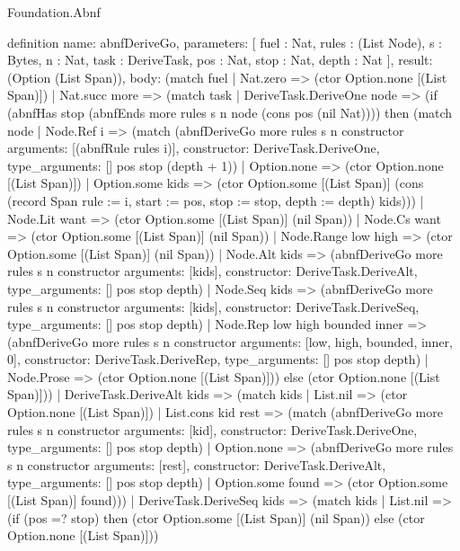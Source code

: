 \begin{lexlean}{Foundation.Abnf}
\begin{semanticmodule}
definition{
  name: abnfDeriveGo,
  parameters: [
    fuel : Nat,
    rules : (List Node),
    s : Bytes,
    n : Nat,
    task : DeriveTask,
    pos : Nat,
    stop : Nat,
    depth : Nat
  ],
  result: (Option (List Span)),
  body: (match fuel
    | Nat.zero => (ctor Option.none [(List Span)])
    | Nat.succ more => (match task
      | DeriveTask.DeriveOne node => (if (abnfHas stop (abnfEnds more rules s n node (cons pos (nil Nat)))) then (match node
        | Node.Ref i => (match (abnfDeriveGo more rules s n constructor{
            arguments: [(abnfRule rules i)],
            constructor: DeriveTask.DeriveOne,
            type_arguments: []
          } pos stop (depth + 1))
          | Option.none => (ctor Option.none [(List Span)])
          | Option.some kids => (ctor Option.some [(List Span)] (cons (record Span {rule := i, start := pos, stop := stop, depth := depth}) kids)))
        | Node.Lit want => (ctor Option.some [(List Span)] (nil Span))
        | Node.Cs want => (ctor Option.some [(List Span)] (nil Span))
        | Node.Range low high => (ctor Option.some [(List Span)] (nil Span))
        | Node.Alt kids => (abnfDeriveGo more rules s n constructor{
          arguments: [kids],
          constructor: DeriveTask.DeriveAlt,
          type_arguments: []
        } pos stop depth)
        | Node.Seq kids => (abnfDeriveGo more rules s n constructor{
          arguments: [kids],
          constructor: DeriveTask.DeriveSeq,
          type_arguments: []
        } pos stop depth)
        | Node.Rep low high bounded inner => (abnfDeriveGo more rules s n constructor{
          arguments: [low, high, bounded, inner, 0],
          constructor: DeriveTask.DeriveRep,
          type_arguments: []
        } pos stop depth)
        | Node.Prose => (ctor Option.none [(List Span)])) else (ctor Option.none [(List Span)]))
      | DeriveTask.DeriveAlt kids => (match kids
        | List.nil => (ctor Option.none [(List Span)])
        | List.cons kid rest => (match (abnfDeriveGo more rules s n constructor{
            arguments: [kid],
            constructor: DeriveTask.DeriveOne,
            type_arguments: []
          } pos stop depth)
          | Option.none => (abnfDeriveGo more rules s n constructor{
            arguments: [rest],
            constructor: DeriveTask.DeriveAlt,
            type_arguments: []
          } pos stop depth)
          | Option.some found => (ctor Option.some [(List Span)] found)))
      | DeriveTask.DeriveSeq kids => (match kids
        | List.nil => (if (pos =? stop) then (ctor Option.some [(List Span)] (nil Span)) else (ctor Option.none [(List Span)]))
}
\end{semanticmodule}
\end{lexlean}
